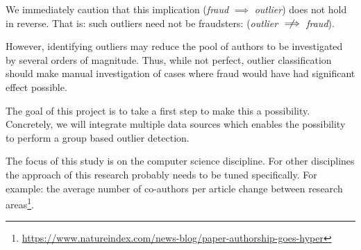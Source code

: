 \documentclass{ou-report}
\begin{document}
We immediately caution that this implication (\emph{fraud} $\implies$ \emph{outlier})
does  not hold in reverse. That is: such outliers need not be fraudsters: 
(\emph{outlier} $\centernot\implies$ \emph{fraud}). 

However, identifying outliers may reduce the pool of authors to be investigated
by se\-veral orders of magnitude. Thus, while not perfect, outlier classification
should make manual investigation of cases where fraud would have had significant
effect possible.

The goal of this project is to take a first step to make this a possibility.
Concretely, we will integrate multiple data sources which enables the
possibility to perform a group based outlier detection.



The focus of this study is on the computer science 
discipline. For other disciplines the approach of this research probably needs
to be tuned specifically. 
For example: the average number of co-authors per article change between research 
areas\footnote{\url{https://www.natureindex.com/news-blog/paper-authorship-goes-hyper}}.
\end{document}
